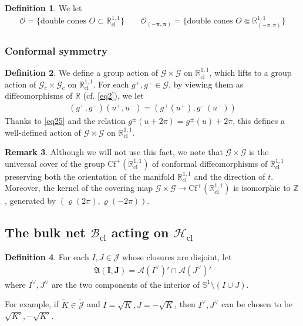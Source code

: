 \documentclass[11pt,b5paper,notitlepage]{article}
\theoremstyle{definition}
\newtheorem{df}{Definition}[section]
\newtheorem{rem}[df]{Remark}
\theoremstyle{plain}
\newcommand{\fk}{\mathfrak}
\newcommand{\wtd}{\widetilde}
\newcommand{\Jtd}{\widetilde{\mathcal J}}
\newcommand{\Zbb}{\mathbb Z}
\newcommand{\Rbb}{\mathbb R}
\newcommand{\Sbb}{{\mathbb S}}
\newcommand{\Gc}{\mathscr G_c}
\newcommand{\MA}{\mathcal A}
\newcommand{\MJ}{\mathcal J}
\newcommand{\MO}{\mathcal O}
\newcommand{\SG}{\mathscr G}
\newcommand{\MHcl}{\mathcal H_{\mathrm{cl}}}
\newcommand{\Rcl}{\mathbb R^{1,1}_{\mathrm{cl}}}
\newcommand{\Rpp}{\mathbb R^{1,1}_{(-\pi,\pi)}}
\newcommand{\Bcl}{\mathcal B_{\mathrm{cl}}}
\newcommand{\Opp}{\mathcal O_{(-\pi,\pi)}}
\numberwithin{equation}{section}
\begin{document}
\begin{df}\label{lb109}
We let
\begin{gather*}
\pmb{\MO}=\{\text{double cones }O\subset\Rcl\}\qquad \pmb{\Opp}=\{\text{double cones }O\Subset\Rpp\}
\end{gather*}
\end{df}


\subsubsection{Conformal symmetry}


\begin{df}
We define a group action of $\SG\times\SG$ on $\Rcl$, which lifts to a group action of $\Gc\times\Gc$ on $\Rcl$. For each $g^+,g^-\in\SG$, by viewing them as diffeomorphisms of $\Rbb$ (cf. \eqref{eq2}), we let
\begin{align*}
(g^+,g^-)(u^+,u^-)=(g^+(u^+),g^-(u^-))
\end{align*}
Thanks to \eqref{eq25} and the relation $g^\pm(u+2\pi)=g^\pm(u)+2\pi$, this defines a well-defined action of $\SG\times\SG$ on $\Rcl$.
\end{df}


\begin{rem}
Although we will not use this fact, we note that $\SG\times\SG$ is the universal cover of the group $\mathrm{Cf}^+(\Rcl)$ of conformal diffeomorphisms of $\Rcl$ preserving both the orientation of the manifold $\Rcl$ and the direction of $t$. Moreover, the kernel of the covering map $\SG\times\SG\rightarrow \mathrm{Cf}^+(\Rcl)$ is isomorphic to $\Zbb$, generated by $(\varrho(2\pi),\varrho(-2\pi))$.
\end{rem}





\subsection{The bulk net $\Bcl$ acting on $\MHcl$}


\begin{df}\label{lb121}
For each $I,J\in\MJ$ whose closures are disjoint, let
\begin{align*}
\pmb{\fk A(I,J)}=\MA(I^\vee)'\cap\MA(J^\vee)'
\end{align*}
where $I^\vee,J^\vee$ are the two components of the interior of $\Sbb^1\setminus(I\cup J)$.
\end{df}

For example, if $\wtd K\in\Jtd$ and $I=\sqrt K,J=-\sqrt K$, then $I^\vee,J^\vee$ can be chosen to be $\sqrt{K'},-\sqrt{K'}$.
\end{document}
